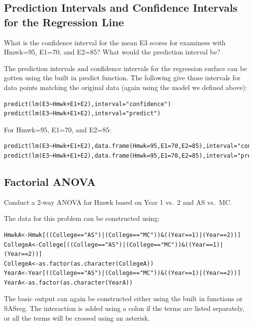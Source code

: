 \documentclass[
]{book}
\begin{document}
\hypertarget{prediction-intervals-and-confidence-intervals-for-the-regression-line}{%
\subsection{Prediction Intervals and Confidence Intervals for the Regression Line}\label{prediction-intervals-and-confidence-intervals-for-the-regression-line}}

What is the confidence interval for the mean E3 scores for examinees with Hmwk=95, E1=70, and E2=85? What would the prediction interval be?

The prediction intervals and confidence intervals for the regression surface can be gotten using the built in predict function. The following give those intervals for data points matching the original data (again using the model we defined above):

\begin{verbatim}
predict(lm(E3~Hmwk+E1+E2),interval="confidence")
predict(lm(E3~Hmwk+E1+E2),interval="predict")
\end{verbatim}

For Hmwk=95, E1=70, and E2=85:

\begin{verbatim}
predict(lm(E3~Hmwk+E1+E2),data.frame(Hmwk=95,E1=70,E2=85),interval="confidence")
predict(lm(E3~Hmwk+E1+E2),data.frame(Hmwk=95,E1=70,E2=85),interval="predict")
\end{verbatim}

\hypertarget{factorial-anova}{%
\subsection{Factorial ANOVA}\label{factorial-anova}}

Conduct a 2-way ANOVA for Hmwk based on Year 1 vs.~2 and AS vs.~MC.

The data for this problem can be constructed using:

\begin{verbatim}
HmwkA<-Hmwk[((College=="AS")|(College=="MC"))&((Year==1)|(Year==2))]
CollegeA<-College[((College=="AS")|(College=="MC"))&((Year==1)|(Year==2))]
CollegeA<-as.factor(as.character(CollegeA))
YearA<-Year[((College=="AS")|(College=="MC"))&((Year==1)|(Year==2))]
YearA<-as.factor(as.character(YearA))
\end{verbatim}

The basic output can again be constructed either using the built in functions or SASreg. The interaction is added using a colon if the terms are listed separately, or all the terms will be crossed using an asterisk.
\end{document}
